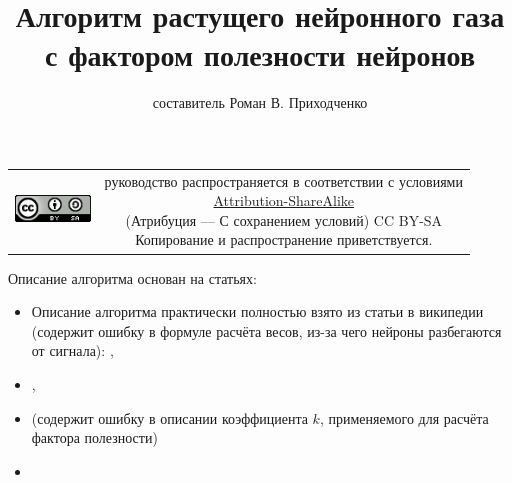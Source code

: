\documentclass[unicode, 12pt, a4paper,oneside,fleqn]{article}
\author{составитель Роман В. Приходченко}
\title{Алгоритм растущего нейронного газа
  с фактором полезности нейронов}
\begin{document}
\renewcommand\bibname{СПИСОК ЛИТЕРАТУРЫ}
\renewcommand\refname{\centering Список литературы}
\renewcommand\contentsname{\centering Содержание}



\makeatletter %
\maketitle

\begin{table}[ht]
  \begin{tabular}{cc}
    \includegraphics[width=2cm]{../../../CC_BY-SA_88x31.png} &
    \shortstack{руководство распространяется в соответствии с
      условиями\\
      \href{http://creativecommons.org/licenses/by-sa/3.0/}{Attribution-ShareAlike} \\
      (Атрибуция — С сохранением условий) CC BY-SA \\
      Копирование и распространение приветствуется.}
  \end{tabular}
\end{table}

\newpage
\tableofcontents

\newpage
Описание алгоритма основан на статьях:
\begin{itemize}
\item Описание алгоритма практически полностью взято из статьи в
  википедии (содержит ошибку в формуле расчёта весов, из-за чего
  нейроны разбегаются от сигнала): \cite[Нейронный
  газ]{ru.wikipedia.org},
\item \cite[A "Neural-Gas" Network Learns
  Topologies]{neural-gas-T.Martinetz-K.Schulten},
\item \cite[Растущий нейронный газ - реализация на языке
  программирования MQL5]{gng-subbotin} (содержит ошибку в описании
  коэффициента $k$, применяемого для расчёта фактора полезности)
  \item \cite[GNG-U]{gng-u-B.Fritzke}
\end{itemize}
\end{document}

